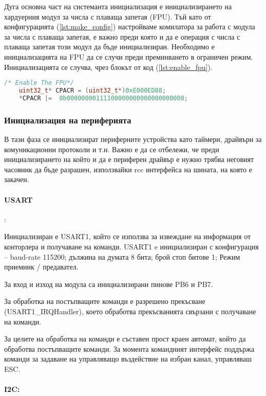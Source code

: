 Дуга основна част на системанта инициализация е инициализирането на хардуерния модул за числа с плаваща запетая (FPU).
Тъй като от конфигурацията (\autoref{lst:make_config}) настройваме комилатора за работа с модула за числа с плаваща запетая, е важно
преди която и да е операция с числа с плаваща запетая този модул да бъде инициализиран.
Необходимо е инициализацията на FPU да се случи преди преминването в ограничен режим.
Инициализацията се случва, чрез блокът от код (\autoref{lst:enable_fpu}).
\begin{lstlisting}[language=c, caption={Инициализация на модула за числа с плаваща запетая}, label={lst:enable_fpu}]
    /* Enable The FPU*/
    uint32_t* CPACR = (uint32_t*)0xE000ED88;
    *CPACR |=  0b00000000111100000000000000000000;
\end{lstlisting}

\subsubsection{Инициализация на периферията}

В тази фаза се инициализират периферните устройства като таймери, драйвъри за комуникационни протоколи и т.н.
Важно е да се отбележи, че преди инициализирането на който и да е периферен драйвър е нужно трябва неговият часовник да бъде разрашен,
използвайки rcc интерфейса на шината, на която е закачен.

\paragraph{USART}:

Инициализиран е USART1, 
който се използва за извеждане на информация от 
конторлера и получаване на команди.
USART1 e инициализиран с конфигурация -- 
baud-rate 115200; 
дължина на думата 8 бита;
брой стоп битове 1;
Режим приемник / предавател.

За вход и изход на модула са инициализирани пинове PB6 и PB7.

За обработка на постъпващите команди е разрешено прекъсване (USART1\_IRQHandler),
което обработва прекъсванията свързани с получаване на команди.

За целите на обработка на команди е съставен прост краен автомат, който 
да обработва постъпващите команди.
За момента командният интерфейс поддържа команди за задаване на
управляващо въздействие на избран канал, управляваш ESC.

\paragraph{I2C:}

